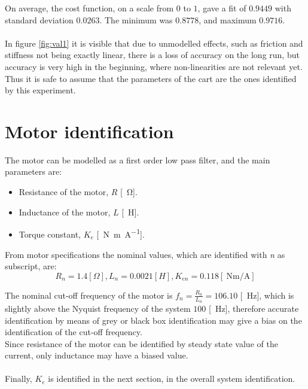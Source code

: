 On average, the cost function, on a scale from $0$ to $1$, gave a fit of $ 0.9449$ with standard deviation $0.0263$.
The minimum was $0.8778$, and maximum $ 0.9716$. \\ \\ 
In figure \ref{fig:val1} it is visible that due to unmodelled effects, such as friction and stiffness not being exactly linear, there is a loss of accuracy on the long run, but accuracy is very high in the beginning, where non-linearities are not relevant yet. Thus it is safe to assume that the parameters of the cart are the ones identified by this experiment.

\section{Motor identification}
\label{sec:motor_id}
The motor can be modelled as a first order low pass filter, and the main parameters are:
\begin{itemize}
\item Resistance of the motor, $R$ [\SI{}{\ohm}].
\item Inductance of the motor, $L$ [\SI{}{\henry}].
\item Torque constant, $K_e$ [\SI{}{\newton \metre \per \ampere}].
\end{itemize}
From motor specifications the nominal values, which are identified with \emph{n} as subscript, are:
$$R_n = 1.4 [\Omega], L_n = 0.0021 [H], K_{en} =0.118 [\SI{}{\newton\metre \per\ampere}]$$

The nominal cut-off frequency of the motor  is $f_n = 	\frac{R_n}{L_n} = 106.10$ [\SI{}{\hertz}], which is slightly above the Nyquist frequency of the system $100$ [\SI{}{\hertz}], therefore accurate identification by means of grey or black box identification may give a bias on the identification of the cut-off frequency. \\ Since resistance of the motor can be identified by  steady state value of the current, only inductance may have a biased value. \\ \\Finally, $K_e$ is identified in the next section, in the overall system identification.

